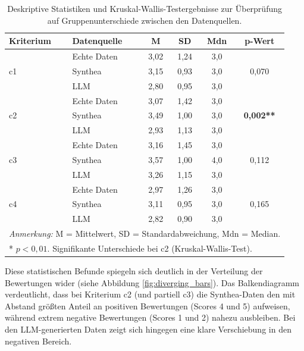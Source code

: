 \begin{description}[style=nextline, font=\bfseries]
\begin{table}[htbp]
\centering
\caption{Deskriptive Statistiken und Kruskal-Wallis-Testergebnisse zur Überprüfung auf Gruppenunterschiede zwischen den Datenquellen.}
\label{tab:descriptive_stats}
\begin{tabular}{llcccc}
\toprule
\textbf{Kriterium} & \textbf{Datenquelle} & \textbf{M} & \textbf{SD} & \textbf{Mdn} & \textbf{p-Wert} \\
\midrule
\multirow{3}{*}{c1} & Echte Daten & 3,02 & 1,24 & 3,0 & \multirow{3}{*}{0,070} \\
                    & Synthea & 3,15 & 0,93 & 3,0 & \\
                    & LLM & 2,80 & 0,95 & 3,0 & \\
\midrule
\multirow{3}{*}{c2} & Echte Daten & 3,07 & 1,42 & 3,0 & \multirow{3}{*}{\textbf{0,002**}} \\
                    & Synthea & 3,49 & 1,00 & 3,0 & \\
                    & LLM & 2,93 & 1,13 & 3,0 & \\
\midrule
\multirow{3}{*}{c3} & Echte Daten & 3,16 & 1,45 & 3,0 & \multirow{3}{*}{0,112} \\
                    & Synthea & 3,57 & 1,00 & 4,0 & \\
                    & LLM & 3,26 & 1,15 & 3,0 & \\
\midrule
\multirow{3}{*}{c4} & Echte Daten & 2,97 & 1,26 & 3,0 & \multirow{3}{*}{0,165} \\
                    & Synthea & 3,11 & 0,95 & 3,0 & \\
                    & LLM & 2,82 & 0,90 & 3,0 & \\
\bottomrule
\multicolumn{6}{l}{\small \textit{Anmerkung:} M = Mittelwert, SD = Standardabweichung, Mdn = Median.} \\
\multicolumn{6}{l}{\small ** $p < 0{,}01$. Signifikante Unterschiede bei c2 (Kruskal-Wallis-Test).}
\end{tabular}
\end{table}

Diese statistischen Befunde spiegeln sich deutlich in der Verteilung der Bewertungen wider (siehe Abbildung \ref{fig:diverging_bars}). Das Balkendiagramm verdeutlicht, dass bei Kriterium c2 (und partiell c3) die Synthea-Daten den mit Abstand größten Anteil an positiven Bewertungen (Scores 4 und 5) aufweisen, während extrem negative Bewertungen (Scores 1 und 2) nahezu ausbleiben. Bei den LLM-generierten Daten zeigt sich hingegen eine klare Verschiebung in den negativen Bereich. 


\end{description}
